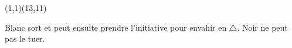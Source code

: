 \documentclass[preview, border=0pt, varwidth=false]{standalone}
\begin{document}
	\setgounit{0.6cm} 
	
\parbox[c][14.65cm][c]{10.2cm}{
	\centering
	
	\begin{psgopartialboard}{(1,1)(13,11)}
		\pass
	\end{psgopartialboard}
	
	\vspace{1em}
	Blanc sort et peut ensuite prendre l'initiative pour envahir en $\triangle$. Noir ne peut pas le tuer.
}
\end{document}
